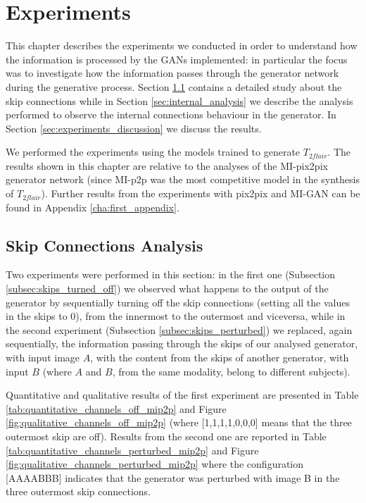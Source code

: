 \chapter{Experiments}
\label{cha:6th_chapter}
This chapter describes the experiments we conducted in order to understand how the information is processed by the \ac{GAN}s implemented: in particular the focus was to investigate how the information passes through the generator network during the generative process.
Section \ref{sec:skip_analysis} contains a detailed study about the skip connections  while in Section \ref{sec:internal_analysis} we describe the analysis performed to observe the internal connections behaviour in the generator. In Section \ref{sec:experiments_discussion} we discuss the results.

We performed the experiments using the models trained to generate $T_{2flair}$. The results shown in this chapter are relative to the analyses of the MI-pix2pix generator network (since MI-p2p was the most competitive model in the synthesis of $T_{2flair}$). Further results from the experiments with pix2pix and MI-GAN can be found in Appendix \ref{cha:first_appendix}.

\section{Skip Connections Analysis}
\label{sec:skip_analysis}
Two experiments were performed in this section: in the first one (Subsection \ref{subsec:skips_turned_off}) we observed what happens to the output of the generator by sequentially turning off the skip connections (setting all the values in the skips to 0), from the innermost to the outermost and viceversa, while in the second experiment (Subsection \ref{subsec:skips_perturbed}) we replaced, again sequentially, the information passing through the skips of our analysed generator, with input image $A$, with the content from the skips of another generator, with input $B$ (where $A$ and $B$, from the same modality, belong to different subjects). 

\vspace{5mm}
Quantitative and qualitative results of the first experiment are presented in Table \ref{tab:quantitative_channels_off_mip2p} and Figure \ref{fig:qualitative_channels_off_mip2p} (where [1,1,1,1,0,0,0] means that the three outermost skip are off). Results from the second one are reported in Table \ref{tab:quantitative_channels_perturbed_mip2p} and Figure \ref{fig:qualitative_channels_perturbed_mip2p} where the configuration [AAAABBB] indicates that the generator was perturbed with image B in the three outermost skip connections.

